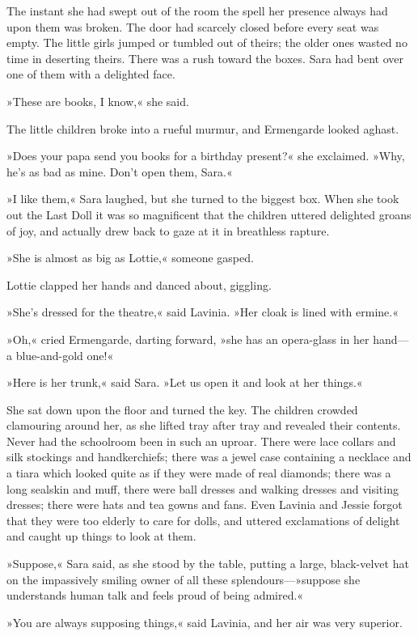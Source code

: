 The instant she had swept out of the room the spell her presence always had upon them was broken. The door had scarcely closed before every seat was empty. The little girls jumped or tumbled out of theirs; the older ones wasted no time in deserting theirs. There was a rush toward the boxes. Sara had bent over one of them with a delighted face.

»These are books, I know,« she said.

The little children broke into a rueful murmur, and Ermengarde looked aghast.

»Does your papa send you books for a birthday present?« she exclaimed. »Why, he's as bad as mine. Don't open them, Sara.«

»I like them,« Sara laughed, but she turned to the biggest box. When she took out the Last Doll it was so magnificent that the children uttered delighted groans of joy, and actually drew back to gaze at it in breathless rapture.

»She is almost as big as Lottie,« someone gasped.

Lottie clapped her hands and danced about, giggling.

»She's dressed for the theatre,« said Lavinia. »Her cloak is lined with ermine.«

»Oh,« cried Ermengarde, darting forward, »she has an opera-glass in her hand—a blue-and-gold one!«

»Here is her trunk,« said Sara. »Let us open it and look at her things.«

She sat down upon the floor and turned the key. The children crowded clamouring around her, as she lifted tray after tray and revealed their contents. Never had the schoolroom been in such an uproar. There were lace collars and silk stockings and handkerchiefs; there was a jewel case containing a necklace and a tiara which looked quite as if they were made of real diamonds; there was a long sealskin and muff, there were ball dresses and walking dresses and visiting dresses; there were hats and tea gowns and fans. Even Lavinia and Jessie forgot that they were too elderly to care for dolls, and uttered exclamations of delight and caught up things to look at them.

»Suppose,« Sara said, as she stood by the table, putting a large, black-velvet hat on the impassively smiling owner of all these splendours—»suppose she understands human talk and feels proud of being admired.«

»You are always supposing things,« said Lavinia, and her air was very superior.

